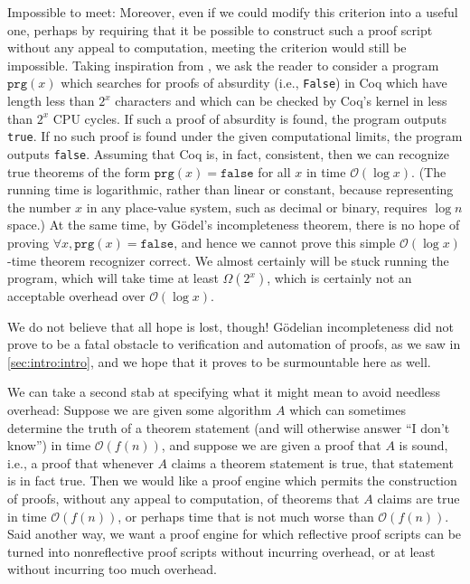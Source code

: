 Impossible to meet:
Moreover, even if we could modify this criterion into a useful one, perhaps by requiring that it be possible to construct such a proof script without any appeal to computation, meeting the criterion would still be impossible.
Taking inspiration from \textcite[pp.~24--25]{Logical2016Garrabrant}, we ask the reader to consider a program $\texttt{prg}(x)$ which searches for proofs of absurdity (i.e., \texttt{False}) in Coq which have length less than $2^x$ characters and which can be checked by Coq's kernel in less than $2^x$ CPU cycles.
If such a proof of absurdity is found, the program outputs \texttt{true}.
If no such proof is found under the given computational limits, the program outputs \texttt{false}.
Assuming that Coq is, in fact, consistent, then we can recognize true theorems of the form $\texttt{prg}(x) = \texttt{false}$ for all $x$ in time $\mathcal O(\log x)$.
(The running time is logarithmic, rather than linear or constant, because representing the number $x$ in any place-value system, such as decimal or binary, requires $\log n$ space.)
At the same time, by Gödel's incompleteness theorem, there is no hope of proving $\forall x, \texttt{prg}(x) = \texttt{false}$, and hence we cannot prove this simple $\mathcal O(\log x)$-time theorem recognizer correct.
We almost certainly will be stuck running the program, which will take time at least $\Omega(2^x)$, which is certainly not an acceptable overhead over $\mathcal O(\log x)$.

We do not believe that all hope is lost, though!
Gödelian incompleteness did not prove to be a fatal obstacle to verification and automation of proofs, as we saw in \autoref{sec:intro:intro}, and we hope that it proves to be surmountable here as well.

We can take a second stab at specifying what it might mean to avoid needless overhead:
Suppose we are given some algorithm $A$ which can sometimes determine the truth of a theorem statement (and will otherwise answer ``I don't know'') in time $\mathcal O(f(n))$, and suppose we are given a proof that $A$ is sound, i.e., a proof that whenever $A$ claims a theorem statement is true, that statement is in fact true.
Then we would like a proof engine which permits the construction of proofs, without any appeal to computation, of theorems that $A$ claims are true in time $\mathcal O(f(n))$, or perhaps time that is not much worse than $\mathcal O(f(n))$.
Said another way, we want a proof engine for which reflective proof scripts can be turned into nonreflective proof scripts without incurring overhead, or at least without incurring too much overhead.

